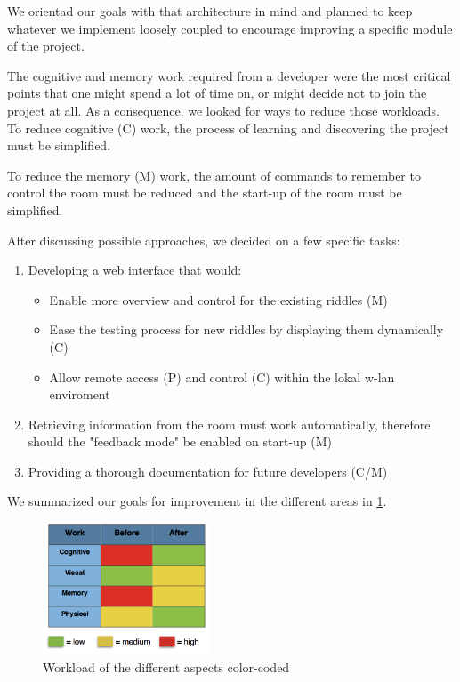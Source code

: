 We orientad our goals with that architecture in mind and planned to keep whatever 
we implement loosely coupled to encourage improving a specific module of the project.

The cognitive and memory work required from a developer were the most critical points 
that one might spend a lot of time on, or might decide not to join the project at all.
As a consequence, we looked for ways to reduce those workloads.
To reduce cognitive (C) work, the process of learning and discovering the project must be simplified.

To reduce the memory (M) work, the amount of commands to remember to control the room must be reduced and the start-up of the room must be simplified.

After discussing possible approaches, we decided on a few specific tasks:
\begin{enumerate}
    \item Developing a web interface that would:
    \begin{itemize}
        \item Enable more overview and control for the existing riddles (M)
        \item Ease the testing process for new riddles by displaying them dynamically (C)
        \item Allow remote access (P) and control (C) within the lokal w-lan enviroment 
    \end{itemize}
    \item Retrieving information from the room must work automatically, therefore should the "feedback mode" be enabled on start-up (M)
    \item Providing a thorough documentation for future developers  (C/M) 
\end{enumerate}

We summarized our goals for improvement in the different areas in \ref{fig:workload}.


\begin{figure}[th]
    \centering
    \includegraphics[width=50mm,scale=.5]{Figures/workload}
    \decoRule
    \caption[workload]{Workload of the different aspects color-coded}
    \label{fig:workload}
\end{figure}

